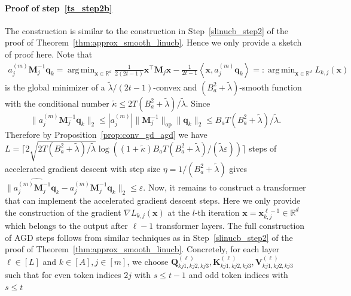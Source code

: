 \documentclass[10pt]{article}
\newcommand{\eps}{\varepsilon}
\DeclareMathOperator*{\argmin}{arg\,min}
\newcommand{\lops}[1]{\|{#1}\|_{\mathrm{op}}}
\newcommand{\<}{\left\langle}
\renewcommand{\>}{\right\rangle}
\renewcommand{\bQ}{\mathbf{Q}}
\newcommand{\R}{\mathbb{R}}
\newcommand{\padecond}{{\tilde \kappa}}
\newcommand{\intvec}{{\mathbf {q}}}
\newcommand{\intmat}{{\mathbf {M}}}
\def\bK{{\mathbf K}}
\def\bQ{{\mathbf Q}}
\def\bV{{\mathbf V}}
\def\bx{{\mathbf x}}
\begin{document}
\paragraph{Proof of step~\ref{ts_step2b}}
The construction is similar to the construction in Step~\ref{slinucb_step2} of the proof of Theorem~\ref{thm:approx_smooth_linucb}. Hence we only provide a sketch of proof here. Note that 
\begin{align*}
    a_j^{(m)}\intmat_j^{-1}\intvec_k=\argmin_{\bx\in\R^d}\frac{1}{2(2t-1)}\bx^\top\intmat_j\bx-\frac{1}{2t-1}\<\bx, a_j^{(m)}\intvec_{k}\>=:\argmin_{\bx\in\R^d} L_{k,j}(\bx)
\end{align*}
is the global minimizer of a $\tilde\lambda/(2t-1)$-convex and $(B_a^2+\tilde\lambda)$-smooth function with the conditional number $\padecond\leq 2T(B_a^2+\tilde\lambda)/\tilde\lambda$. Since $$\|a_j^{(m)}\intmat_j^{-1}\intvec_k\|_2\leq|a_j^{(m)}|\lops{\intmat_j^{-1}}\|\intvec_k\|_2\leq B_aT(B_a^2+\tilde\lambda)/\tilde\lambda.$$
Therefore by Proposition~\ref{prop:conv_gd_agd} we have
$L=\lceil2\sqrt{2 T(B_a^2+\tilde\lambda)/\tilde\lambda}\log((1+\padecond)B_aT(B_a^2+\tilde\lambda)/(\tilde\lambda\eps))\rceil$ steps of accelerated gradient descent with step size $\eta=1/(B_a^2+\tilde\lambda)$ gives  $\|\widehat{a_j^{(m)}\intmat_j^{-1}\intvec_k}-a_j^{(m)}\intmat_j^{-1}\intvec_k\|_2\leq\eps$. Now, it remains to construct a transformer that can implement the accelerated gradient descent steps. Here we only provide the construction of the gradient $\nabla L_{k,j}(\bx)$ at the $l$-th iteration $\bx=\bx_{k,j}^{\ell-1}\in\R^d$ which belongs to the output after $\ell-1$ transformer layers.  The full construction of AGD steps follows from similar techniques as in Step~\ref{slinucb_step2} of  the proof of  
Theorem~\ref{thm:approx_smooth_linucb}. Concretely, for each layer $\ell\in[L]$ and $k\in[A],j\in[m]$, we choose 
$\bQ_{kj1,kj2,kj3}^{(\ell)},\bK_{kj1,kj2,kj3}^{(\ell)},\bV_{kj1,kj2,kj3}^{(\ell)}$ such that for even token indices $2j$ with $s\leq t-1$ and odd token indices with $s\leq t$
\end{document}
